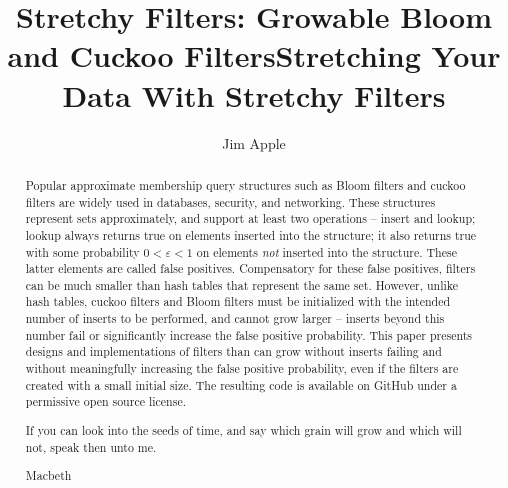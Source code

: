 \documentclass[letterpaper,twocolumn,10pt]{article}
\newcommand{\Taffy}{Stretchy}
\newcommand{\Taffy}{Taffy}
\begin{document}
\ifanon
\title{\Large \bf \Taffy{} Filters: Growable Bloom and Cuckoo Filters}
\else
\title{\Large \bf Stretching Your Data With \Taffy{} Filters}
\fi

\ifanon
\else
\author{\rm Jim Apple}
\fi






\maketitle

\begin{abstract}
Popular approximate membership query structures such as Bloom filters and cuckoo filters are widely used in databases, security, and networking.
These structures represent sets approximately, and support at least two operations -- insert and lookup; lookup always returns true on elements inserted into the structure; it also returns true with some probability $0 < \varepsilon < 1$ on elements {\em not} inserted into the structure.
These latter elements are called false positives.
Compensatory for these false positives, filters can be much smaller than hash tables that represent the same set.
However, unlike hash tables, cuckoo filters and Bloom filters must be initialized with the intended number of inserts to be performed, and cannot grow larger --
inserts beyond this number fail or significantly increase the false positive probability.
This paper presents designs and implementations of filters than can grow without inserts failing and without meaningfully increasing the false positive probability, even if the filters are created with a small initial size.
The resulting code is available \ifanon\else on GitHub \fi under a permissive open source license.%
\ifepigraph
\epigraph{If you can look into the seeds of time, and say which grain will grow and which will not, speak then unto me.}{Macbeth}
\fi
\end{abstract}
\end{document}
